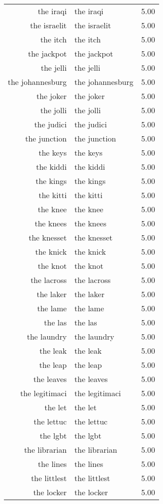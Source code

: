 \begin{table}[ht]
\begin{tabular}{rlr}
  the iraqi & the iraqi & 5.00 \\ 
  the israelit & the israelit & 5.00 \\ 
  the itch & the itch & 5.00 \\ 
  the jackpot & the jackpot & 5.00 \\ 
  the jelli & the jelli & 5.00 \\ 
  the johannesburg & the johannesburg & 5.00 \\ 
  the joker & the joker & 5.00 \\ 
  the jolli & the jolli & 5.00 \\ 
  the judici & the judici & 5.00 \\ 
  the junction & the junction & 5.00 \\ 
  the keys & the keys & 5.00 \\ 
  the kiddi & the kiddi & 5.00 \\ 
  the kings & the kings & 5.00 \\ 
  the kitti & the kitti & 5.00 \\ 
  the knee & the knee & 5.00 \\ 
  the knees & the knees & 5.00 \\ 
  the knesset & the knesset & 5.00 \\ 
  the knick & the knick & 5.00 \\ 
  the knot & the knot & 5.00 \\ 
  the lacross & the lacross & 5.00 \\ 
  the laker & the laker & 5.00 \\ 
  the lame & the lame & 5.00 \\ 
  the las & the las & 5.00 \\ 
  the laundry & the laundry & 5.00 \\ 
  the leak & the leak & 5.00 \\ 
  the leap & the leap & 5.00 \\ 
  the leaves & the leaves & 5.00 \\ 
  the legitimaci & the legitimaci & 5.00 \\ 
  the let & the let & 5.00 \\ 
  the lettuc & the lettuc & 5.00 \\ 
  the lgbt & the lgbt & 5.00 \\ 
  the librarian & the librarian & 5.00 \\ 
  the lines & the lines & 5.00 \\ 
  the littlest & the littlest & 5.00 \\ 
  the locker & the locker & 5.00 \\ 

\end{tabular}
\end{table}
